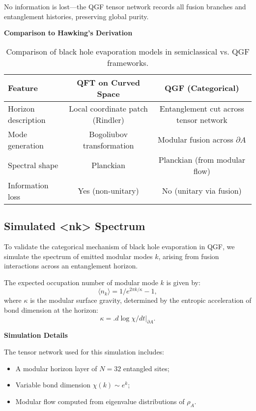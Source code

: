 \documentclass[11pt]{article}
\def\frac#1#2{#1/#2}
\def\left{}
\def\right{}
\def\texorpdfstring#1#2{#2}
\begin{document}
No information is lost—the QGF tensor network records all fusion branches and entanglement histories, preserving global purity.

\vspace{0.5em}
\noindent\textbf{Comparison to Hawking’s Derivation}

\begin{table}[H]
\centering
\renewcommand{\arraystretch}{1.2}
\begin{tabular}{|l|c|c|}
\hline
\textbf{Feature} & \textbf{QFT on Curved Space} & \textbf{QGF (Categorical)} \\
\hline
Horizon description & Local coordinate patch (Rindler) & Entanglement cut across tensor network \\
Mode generation & Bogoliubov transformation & Modular fusion across \( \partial A \) \\
Spectral shape & Planckian & Planckian (from modular flow) \\
Information loss & Yes (non-unitary) & No (unitary via fusion) \\
\hline
\end{tabular}
\caption{Comparison of black hole evaporation models in semiclassical vs. QGF frameworks.}
\label{tab:evaporation-compare}
\end{table}



\subsection{\texorpdfstring{Simulated \( \langle n_k \rangle \) Spectrum}{Simulated <nk> Spectrum}}

To validate the categorical mechanism of black hole evaporation in QGF, we simulate the spectrum of emitted modular modes \( k \), arising from fusion interactions across an entanglement horizon.

The expected occupation number of modular mode \( k \) is given by:
\[
\langle n_k \rangle = \frac{1}{e^{2\pi k / \kappa} - 1},
\]
where \( \kappa \) is the modular surface gravity, determined by the entropic acceleration of bond dimension at the horizon:
\[
\kappa = \left. \frac{d \log \chi}{dt} \right|_{\partial A}.
\]

\vspace{0.5em}
\noindent\textbf{Simulation Details}

The tensor network used for this simulation includes:
\begin{itemize}
  \item A modular horizon layer of \( N = 32 \) entangled sites;
  \item Variable bond dimension \( \chi(k) \sim e^{k} \);
  \item Modular flow computed from eigenvalue distributions of \( \rho_A \).
\end{itemize}
\end{document}
